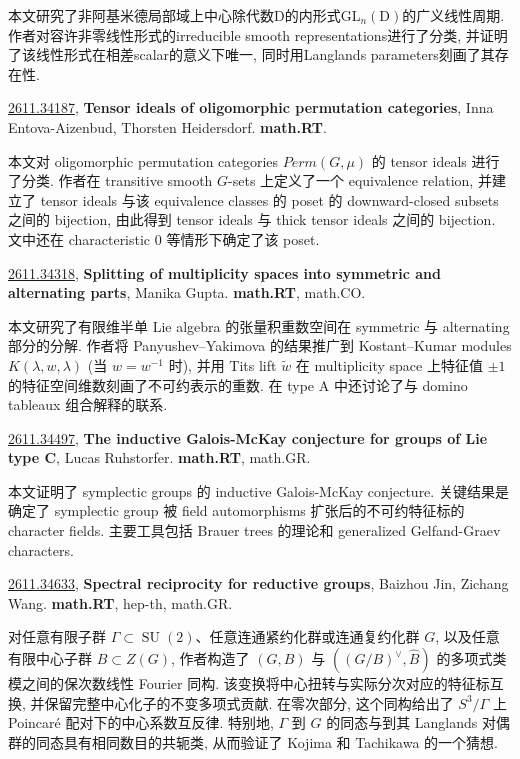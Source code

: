 \documentclass[9pt, a4paper]{article}
\theoremstyle{plain}
\theoremstyle{definition}
\theoremstyle{remark}
\newcommand{\arxivwithtarget}[3]{\hypertarget{#1}{}\href{https://arxiv.org/abs/#1}{#1}, \textbf{\textcolor{arxivblue}{#2}}, #3. }
\begin{document}
本文研究了非阿基米德局部域上中心除代数\(\mathrm{D}\)的内形式\(\mathrm{GL}_n(\mathrm{D})\)的广义线性周期. 作者对容许非零线性形式的irreducible smooth representations进行了分类, 并证明了该线性形式在相差scalar的意义下唯一, 同时用Langlands parameters刻画了其存在性.


\arxivwithtarget{2611.34187}{Tensor ideals of oligomorphic permutation categories}{Inna Entova-Aizenbud, Thorsten Heidersdorf}\textbf{math.RT}.

本文对 oligomorphic permutation categories $Perm(G,\mu)$ 的 tensor ideals 进行了分类. 作者在 transitive smooth $G$-sets 上定义了一个 equivalence relation, 并建立了 tensor ideals 与该 equivalence classes 的 poset 的 downward-closed subsets 之间的 bijection, 由此得到 tensor ideals 与 thick tensor ideals 之间的 bijection. 文中还在 characteristic $0$ 等情形下确定了该 poset.


\arxivwithtarget{2611.34318}{Splitting of multiplicity spaces into symmetric and alternating parts}{Manika Gupta}\textbf{math.RT}, math.CO.

本文研究了有限维半单 Lie algebra 的张量积重数空间在 symmetric 与 alternating 部分的分解. 作者将 Panyushev--Yakimova 的结果推广到 Kostant--Kumar modules \(K(\lambda,w,\lambda)\) (当 \(w=w^{-1}\) 时), 并用 Tits lift \(\widetilde w\) 在 multiplicity space 上特征值 \(\pm 1\) 的特征空间维数刻画了不可约表示的重数. 在 type A 中还讨论了与 domino tableaux 组合解释的联系.


\arxivwithtarget{2611.34497}{The inductive Galois-McKay conjecture for groups of Lie type C}{Lucas Ruhstorfer}\textbf{math.RT}, math.GR.

本文证明了 symplectic groups 的 inductive Galois-McKay conjecture. 关键结果是确定了 symplectic group 被 field automorphisms 扩张后的不可约特征标的 character fields. 主要工具包括 Brauer trees 的理论和 generalized Gelfand-Graev characters.


\arxivwithtarget{2611.34633}{Spectral reciprocity for reductive groups}{Baizhou Jin, Zichang Wang}\textbf{math.RT}, hep-th, math.GR.

对任意有限子群 $\Gamma\subset\operatorname{SU}(2)$、任意连通紧约化群或连通复约化群 $G$, 以及任意有限中心子群 $B\subset Z(G)$, 作者构造了 $(G,B)$ 与 $((G/B)^\vee,\widehat B)$ 的多项式类模之间的保次数线性 Fourier 同构. 该变换将中心扭转与实际分次对应的特征标互换, 并保留完整中心化子的不变多项式贡献. 在零次部分, 这个同构给出了 $S^3/\Gamma$ 上 Poincaré 配对下的中心系数互反律. 特别地, $\Gamma$ 到 $G$ 的同态与到其 Langlands 对偶群的同态具有相同数目的共轭类, 从而验证了 Kojima 和 Tachikawa 的一个猜想.
\end{document}
